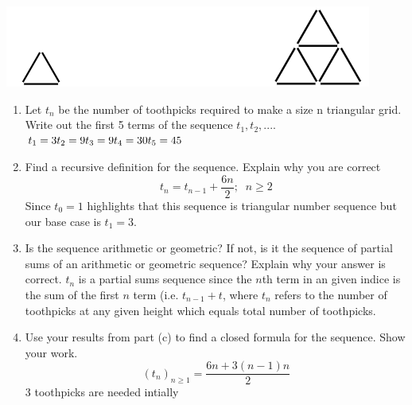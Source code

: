 \documentclass[11pt,a4paper]{article}
\begin{document}
\begin{enumerate}
            \begin{center}
            \includegraphics[width=.5\textwidth]{hw6_graphic2}
            \end{center}

                \begin{enumerate}
                    \item Let $t_n$ be the number of toothpicks required to make a size n triangular grid. Write out the first 5 terms of the sequence $t_1, t_2, ...$.
                        $t_1 = 3\\t_2 = 9\\t_3 = 9\\t_4 = 30\\t_5 = 45$
                    \item Find a recursive definition for the sequence. Explain why you are correct
                        $$t_n = t_{n-1} + \frac{6n}{2};\;\;n\geq 2$$
                        Since $t_0 = 1$ highlights that this sequence is triangular number sequence but our base case is $t_1 = 3$.
                    \item Is the sequence arithmetic or geometric? If not, is it the sequence of partial sums of an arithmetic or geometric sequence? Explain why your answer is correct.
                        $t_n$ is a partial sums sequence since the $n$th term in an given indice is the sum of the first $n$ term (i.e. $t_{n-1} + t$, where $t_n$ refers to the number of toothpicks at any given height which equals total number of toothpicks.
                    \item Use your results from part (c) to find a closed formula for the sequence. Show your work.
                        $$(t_n)_{n\geq 1} = \frac{6n + 3(n - 1)n}{2}$$
                        3 toothpicks are needed intially
                \end{enumerate}


\end{enumerate}
\end{document}
